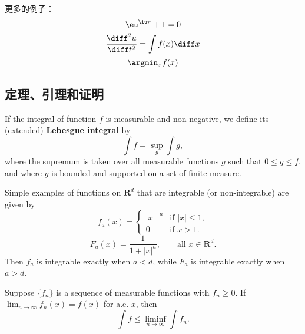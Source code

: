 更多的例子：
\begin{equation}
  \eu^{\iu\pi} + 1 = 0
\end{equation}
\begin{equation}
  \frac{\diff^2u}{\diff t^2} = \int f(x) \diff x
\end{equation}
\begin{equation}
  \argmin_x f(x)
\end{equation}

\subsection{定理、引理和证明}

\begin{definition}
  If the integral of function $f$ is measurable and non-negative, we define
  its (extended) \textbf{Lebesgue integral} by
  \begin{equation}
    \int f = \sup_g \int g,
  \end{equation}
  where the supremum is taken over all measurable functions $g$ such that
  $0 \leq g \leq f$, and where $g$ is bounded and supported on a set of
  finite measure.
\end{definition}

\begin{example}
  Simple examples of functions on $\mathbf{R}^d$ that are integrable
  (or non-integrable) are given by
  \begin{equation}
    f_a(x) =
    \begin{cases}
      |x|^{-a} & \text{if } |x| \leq 1, \\
      0        & \text{if } x > 1.
    \end{cases}
  \end{equation}
  \begin{equation}
    F_a(x) = \frac{1}{1 + |x|^a}, \qquad \text{all } x \in \mathbf{R}^d.
  \end{equation}
  Then $f_a$ is integrable exactly when $a < d$, while $F_a$ is integrable
  exactly when $a > d$.
\end{example}

\begin{lemma}[Fatou]
  Suppose $\{f_n\}$ is a sequence of measurable functions with $f_n \geq 0$.
  If $\lim_{n \to \infty} f_n(x) = f(x)$ for a.e. $x$, then
  \begin{equation}
    \int f \leq \liminf_{n \to \infty} \int f_n.
  \end{equation}
\end{lemma}

